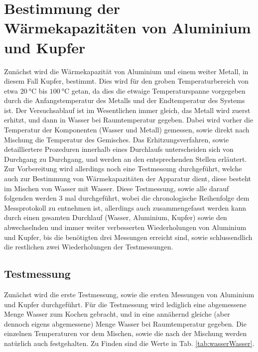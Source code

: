 \documentclass{include/protokollclass}
\begin{document}
    \tableofcontents               
    
\chapter{Bestimmung der Wärmekapazitäten von Aluminium und Kupfer}
Zunächst wird die Wärmekapazität von Aluminium und einem weiter Metall, in diesem Fall Kupfer, bestimmt. Dies wird für den groben Temperaturbereich von etwa $\SI{20}{\celsius}$ bis $\SI{100}{\celsius}$ getan, da dies die etwaige Temperaturspanne vorgegeben durch die Anfangstemperatur des Metalls und der Endtemperatur des Systems ist. Der Versuchsablauf ist im Wesentlichen immer gleich, das Metall wird zuerst erhitzt, und dann in Wasser bei Raumtemperatur gegeben. Dabei wird vorher die Temperatur der Komponenten (Wasser und Metall) gemessen, sowie direkt nach Mischung die Temperatur des Gemisches. Das Erhitzungsverfahren, sowie detailliertere Prozeduren innerhalb eines Durchlaufs unterscheiden sich von Durchgang zu Durchgang, und werden an den entsprechenden Stellen erläutert. Zur Vorbereitung wird allerdings noch eine Testmessung durchgeführt, welche auch zur Bestimmung von Wärmekapazitäten der Apparatur dient, diese besteht im Mischen von Wasser mit Wasser. Diese Testmessung, sowie alle darauf folgenden werden 3 mal durchgeführt, wobei die chronologische Reihenfolge dem Messprotokoll zu entnehmen ist, allerdings auch zusammengefasst werden kann durch einen gesamten Durchlauf (Wasser, Aluminium, Kupfer) sowie den abwechselnden und immer weiter verbesserten Wiederholungen von Aluminium und Kupfer, bis die benötigten drei Messungen erreicht sind, sowie schlussendlich die restlichen zwei Wiederholungen der Testmessungen.

\section{Testmessung}
Zunächst wird die erste Testmessung, sowie die ersten Messungen von Aluminium und Kupfer durchgeführt. Für die Testmessung wird lediglich eine abgemessene Menge Wasser zum Kochen gebracht, und in eine annähernd gleiche (aber dennoch eigens abgemessene) Menge Wasser bei Raumtemperatur gegeben. Die einzelnen Temperaturen vor dem Mischen, sowie die nach der Mischung werden natürlich auch festgehalten. Zu Finden sind die Werte in Tab. \ref{tab:wasserWasser}.
\end{document}
